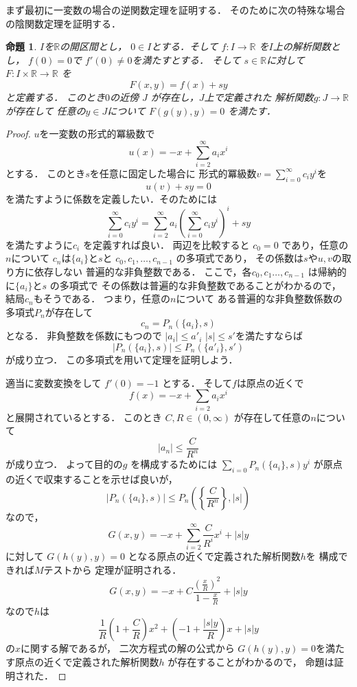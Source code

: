 \documentclass[leqno, a4paper, 12pt]{jsarticle}
\newtheorem{prop}[thm]{命題}
\newcommand{\rr}{\mathbb{R}}
\begin{document}
まず最初に一変数の場合の逆関数定理を証明する．
そのために次の特殊な場合の陰関数定理を証明する．
\begin{prop}
$I$を$\rr$の開区間とし，
$0\in I$とする．そして
$f: I\to \rr$
を$I$上の解析関数とし，
$f(0)=0$で
$f'(0)\neq 0$を満たすとする．
そして
$s\in \rr$に対して
$F: I\times \rr\to \rr$
 を
 \[
 F(x, y)=f(x)+sy
 \]
 と定義する．
 このとき$0$の近傍
 $J$
 が存在し，$J$上で定義された
 解析関数$g: J\to \rr$が存在して
 任意の$y\in J$について
 $F(g(y), y)=0$
 を満たす．
\end{prop}
\begin{proof}
$u$を一変数の形式的冪級数で
\[
u(x)=-x+\sum_{i=2}^{\infty}a_ix^i
\]
とする．
このとき$s$を任意に固定した場合に
形式的冪級数$v=\sum_{i=0}^{\infty}c_iy^i$を
\[
u(v)+sy=0
\]
を満たすように係数を定義したい．そのためには
\[
\sum_{i=0}^{\infty}c_iy^i=
\sum_{i=2}^{\infty}a_i\left(\sum_{i=0}^{\infty}c_iy^i\right)^i+sy
\]
を満たすように$c_i$
を定義すれば良い．
両辺を比較すると
$c_0=0$
であり，任意の$n$について
$c_n$は$\{a_i\}$と$s$と
$c_0, c_1, \dots, c_{n-1}$
の多項式であり，
その係数は$s$や$u, v$の取り方に依存しない
普遍的な非負整数である．
ここで，各$c_0, c_1\dots, c_{n-1}$
は帰納的に$\{a_i\}$と$s$
の多項式で
その係数は普遍的な非負整数であることがわかるので，
結局$c_{n}$もそうである．
つまり，任意の$n$について
ある普遍的な非負整数係数の多項式$P_n$が存在して
\[
c_{n}=P_n(\{a_i\}, s)
\]
となる．
非負整数を係数にもつので
$|a_i|\le a'_i$
$|s|\le s'$を満たすならば
\[
|P_n(\{a_i\}, s)|\le P_n(\{a'_i\}, s')
\]
が成り立つ．
この多項式を用いて定理を証明しよう．

適当に変数変換をして
$f'(0)=-1$
とする．
そして$f$は原点の近くで
\[
f(x)=-x+\sum_{i=2}a_ix^i
\]
と展開されているとする．
このとき
$C, R\in (0, \infty)$
が存在して任意の$n$について
\[
|a_n|\le \frac{C}{R^n}
\]
が成り立つ．
よって目的の$g$
を構成するためには
$\sum_{i=0}P_n(\{a_i\}, s)y^i$
が原点の近くで収束することを示せば良いが，
\[
|P_n(\{a_i\}, s)|\le P_n\left(\left\{\frac{C}{R^n}\right\}, |s|\right)
\]
なので，
\[
G(x, y)=-x+\sum_{i=2}^{\infty}\frac{C}{R^i}x^{i}+|s|y
\]
に対して
$G(h(y), y)=0$
となる原点の近くで定義された解析関数$h$を
構成できれば$M$テストから
定理が証明される．
\[
G(x, y)=-x+C\frac{\left(\frac{x}{R}\right)^2}{1-\frac{x}{R}}+|s|y
\]
なので$h$は
\[
\frac{1}{R}\left(1+\frac{C}{R}\right)x^{2}+\left(-1+\frac{|s|y}{R}\right)x+|s|y
\]
の$x$に関する解であるが，
二次方程式の解の公式から
$G(h(y), y)=0$を満たす原点の近くで定義された解析関数$h$
が存在することがわかるので，
命題は証明された．

\end{proof}
\end{document}
